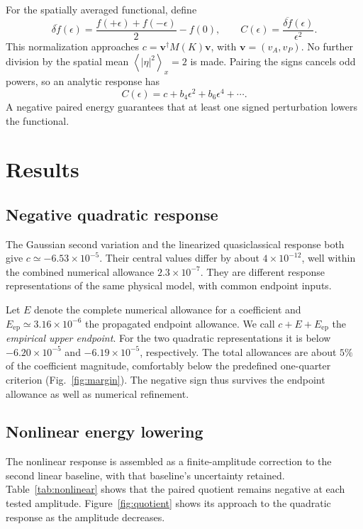 \documentclass[11pt,a4paper]{article}
\newcommand{\av}[1]{\left\langle #1\right\rangle}
\begin{document}
For the spatially averaged functional, define
\begin{equation}\label{eq:paired}
 \overline{\delta f}(\epsilon)=\frac{f(+\epsilon)+f(-\epsilon)}{2}-f(0),
 \qquad C(\epsilon)=\frac{\overline{\delta f}(\epsilon)}{\epsilon^2}.
\end{equation}
This normalization approaches $c=\bm v^\dagger M(K)\bm v$, with $\bm v=(v_A,v_P)$. No further division by the spatial mean $\av{|\eta|^2}_x=2$ is made. Pairing the signs cancels odd powers, so an analytic response has
\begin{equation}\label{eq:epsilonexp}
 C(\epsilon)=c+b_4\epsilon^2+b_6\epsilon^4+\cdots.
\end{equation}
A negative paired energy guarantees that at least one signed perturbation lowers the functional.

\section{Results}\label{sec:results}
\subsection{Negative quadratic response}
The Gaussian second variation and the linearized quasiclassical response both give $c\simeq-6.53\times10^{-5}$. Their central values differ by about $4\times10^{-12}$, well within the combined numerical allowance $2.3\times10^{-7}$. They are different response representations of the same physical model, with common endpoint inputs.

Let $E$ denote the complete numerical allowance for a coefficient and $E_{\mathrm{ep}}\simeq3.16\times10^{-6}$ the propagated endpoint allowance. We call $c+E+E_{\mathrm{ep}}$ the \emph{empirical upper endpoint}. For the two quadratic representations it is below $-6.20\times10^{-5}$ and $-6.19\times10^{-5}$, respectively. The total allowances are about $5\%$ of the coefficient magnitude, comfortably below the predefined one-quarter criterion (Fig.~\ref{fig:margin}). The negative sign thus survives the endpoint allowance as well as numerical refinement.

\subsection{Nonlinear energy lowering}
The nonlinear response is assembled as a finite-amplitude correction to the second linear baseline, with that baseline's uncertainty retained. Table~\ref{tab:nonlinear} shows that the paired quotient remains negative at each tested amplitude. Figure~\ref{fig:quotient} shows its approach to the quadratic response as the amplitude decreases.
\end{document}
